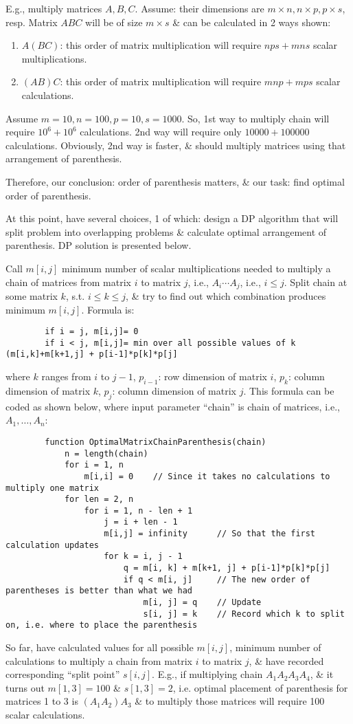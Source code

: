 \documentclass{article}
\begin{document}
\begin{enumerate}
	E.g., multiply matrices $A,B,C$. Assume: their dimensions are $m\times n,n\times p,p\times s$, resp. Matrix $ABC$ will be of size $m\times s$ \& can be calculated in 2 ways shown:
	\begin{enumerate}
		\item $A(BC)$: this order of matrix multiplication will require $nps + mns$ scalar multiplications.
		\item $(AB)C$: this order of matrix multiplication will require $mnp + mps$ scalar calculations.
	\end{enumerate}
	Assume $m = 10,n = 100,p = 10,s = 1000$. So, 1st way to multiply chain will require $10^6 + 10^6$ calculations. 2nd way will require only $10000 + 100000$ calculations. Obviously, 2nd way is faster, \& should multiply matrices using that arrangement of parenthesis.
	
	Therefore, our conclusion: order of parenthesis matters, \& our task: find optimal order of parenthesis.
	
	At this point, have several choices, 1 of which: design a DP algorithm that will split problem into overlapping problems \& calculate optimal arrangement of parenthesis. DP solution is presented below.
	
	Call $m[i,j]$ minimum number of scalar multiplications needed to multiply a chain of matrices from matrix $i$ to matrix $j$, i.e., $A_i\cdots A_j$, i.e., $i\le j$. Split chain at some matrix $k$, s.t. $i\le k\le j$, \& try to find out which combination produces minimum $m[i,j]$. Formula is:
	\begin{verbatim}
		if i = j, m[i,j]= 0
		if i < j, m[i,j]= min over all possible values of k (m[i,k]+m[k+1,j] + p[i-1]*p[k]*p[j]
	\end{verbatim}
	where $k$ ranges from $i$ to $j - 1$, $p_{i - 1}$: row dimension of matrix $i$, $p_k$: column dimension of matrix $k$, $p_j$: column dimension of matrix $j$. This formula can be coded as shown below, where input parameter ``chain'' is chain of matrices, i.e., $A_1,\ldots,A_n$:
	\begin{verbatim}
		function OptimalMatrixChainParenthesis(chain)
		    n = length(chain)
		    for i = 1, n
		        m[i,i] = 0    // Since it takes no calculations to multiply one matrix
		    for len = 2, n
		        for i = 1, n - len + 1
		            j = i + len - 1
		            m[i,j] = infinity      // So that the first calculation updates
		            for k = i, j - 1
		                q = m[i, k] + m[k+1, j] + p[i-1]*p[k]*p[j]
		                if q < m[i, j]     // The new order of parentheses is better than what we had
		                    m[i, j] = q    // Update
		                    s[i, j] = k    // Record which k to split on, i.e. where to place the parenthesis
	\end{verbatim}
	So far, have calculated values for all possible $m[i,j]$, minimum number of calculations to multiply a chain from matrix $i$ to matrix $j$, \& have recorded corresponding ``split point'' $s[i,j]$. E.g., if multiplying chain $A_1A_2A_3A_4$, \& it turns out $m[1,3] = 100$ \& $s[1,3] = 2$, i.e. optimal placement of parenthesis for matrices 1 to 3 is $(A_1A_2)A_3$ \& to multiply those matrices will require 100 scalar calculations.
	

\end{enumerate}
\end{document}
